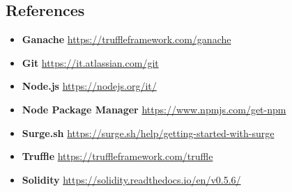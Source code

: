 \subsection{References}
	\begin{itemize}
		\item \textbf{Ganache} \url{https://truffleframework.com/ganache}
		\item \textbf{Git} \url{https://it.atlassian.com/git}
		\item \textbf{Node.js} \url{https://nodejs.org/it/}
		\item \textbf{Node Package Manager} \url{https://www.npmjs.com/get-npm}
		\item \textbf{Surge.sh} \url{https://surge.sh/help/getting-started-with-surge}
		\item \textbf{Truffle} \url{https://truffleframework.com/truffle}
		\item \textbf{Solidity} \url{https://solidity.readthedocs.io/en/v0.5.6/}
	\end{itemize}